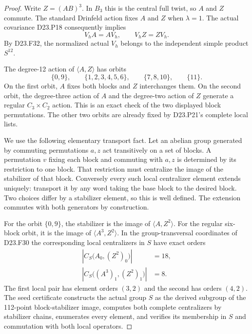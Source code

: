 \begin{proof}
Write $Z=(AB)^3$. In $B_3$ this is the central full twist,
so $A$ and $Z$ commute. The standard Drinfeld action fixes
$A$ and $Z$ when $\lambda=1$. The actual covariance
D23.P18 consequently implies
\[
                         V_hA=AV_h,\qquad V_hZ=ZV_h.
 \tag{D23.P22.1}
\]
By D23.F32, the normalized actual $V_h$ belongs to the
independent simple product $S^{12}$.

The degree-12 action of $\langle A,Z\rangle$ has orbits
\[
       \{0,9\},\qquad\{1,2,3,4,5,6\},\qquad
       \{7,8,10\},\qquad\{11\}.                          \tag{D23.P22.2}
\]
On the first orbit, $A$ fixes both blocks and $Z$
interchanges them. On the second orbit, the degree-three
action of $A$ and the degree-two action of $Z$ generate a
regular $C_3\times C_2$ action. This is an exact check of
the two displayed block permutations. The other two orbits
are already fixed by D23.P21's complete local lists.

We use the following elementary transport fact. Let an
abelian group generated by commuting permutations $a,z$
act transitively on a set of blocks. A permutation $v$
fixing each block and commuting with $a,z$ is determined
by its restriction to one block. That restriction must
centralize the image of the stabilizer of that block.
Conversely every such local centralizer element extends
uniquely: transport it by any word taking the base block
to the desired block. Two choices differ by a stabilizer
element, so this is well defined. The extension commutes
with both generators by construction.

For the orbit $\{0,9\}$, the stabilizer is the image of
$\langle A,Z^2\rangle$. For the regular six-block orbit,
it is the image of $\langle A^3,Z^2\rangle$. In the
group-transversal coordinates of D23.F30 the corresponding
local centralizers in $S$ have exact orders
\[
 \begin{split}
 \left|C_S\bigl(A_0,(Z^2)_0\bigr)\right|&=18,\\
 \left|C_S\bigl((A^3)_1,(Z^2)_1\bigr)\right|&=8.
 \end{split}                                               \tag{D23.P22.3}
\]
The first local pair has element orders $(3,2)$ and the
second has orders $(4,2)$. The seed certificate constructs
the actual group $S$ as the derived subgroup of the
112-point block-stabilizer image, computes both complete
centralizers by stabilizer chains, enumerates every element,
and verifies its membership in $S$ and commutation with
both local operators.


\end{proof}
